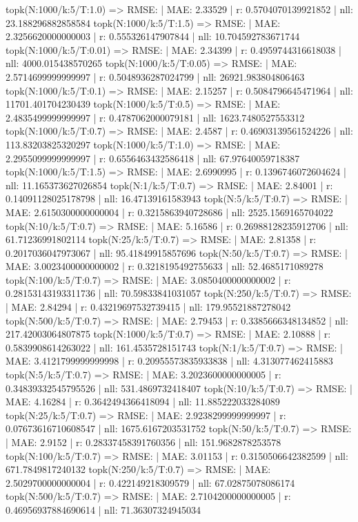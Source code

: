 topk(N:1000/k:5/T:1.0) => RMSE: | MAE: 2.33529 | r: 0.5704070139921852 | nll: 23.188296882858584
topk(N:1000/k:5/T:1.5) => RMSE: | MAE: 2.3256620000000003 | r: 0.555326147907844 | nll: 10.704592783671744
topk(N:1000/k:5/T:0.01) => RMSE: | MAE: 2.34399 | r: 0.4959744316618038 | nll: 4000.015438570265
topk(N:1000/k:5/T:0.05) => RMSE: | MAE: 2.5714699999999997 | r: 0.5048936287024799 | nll: 26921.983804806463
topk(N:1000/k:5/T:0.1) => RMSE: | MAE: 2.15257 | r: 0.5084796645471964 | nll: 11701.401704230439
topk(N:1000/k:5/T:0.5) => RMSE: | MAE: 2.4835499999999997 | r: 0.4787062000079181 | nll: 1623.7480527553312
topk(N:1000/k:5/T:0.7) => RMSE: | MAE: 2.4587 | r: 0.46903139561524226 | nll: 113.83203825320297
topk(N:1000/k:5/T:1.0) => RMSE: | MAE: 2.2955099999999997 | r: 0.6556463432586418 | nll: 67.97640059718387
topk(N:1000/k:5/T:1.5) => RMSE: | MAE: 2.6990995 | r: 0.1396746072604624 | nll: 11.165373627026854
topk(N:1/k:5/T:0.7) => RMSE: | MAE: 2.84001 | r: 0.14091128025178798 | nll: 16.47139161583943
topk(N:5/k:5/T:0.7) => RMSE: | MAE: 2.6150300000000004 | r: 0.3215863940728686 | nll: 2525.1569165704022
topk(N:10/k:5/T:0.7) => RMSE: | MAE: 5.16586 | r: 0.26988128235912706 | nll: 61.71236991802114
topk(N:25/k:5/T:0.7) => RMSE: | MAE: 2.81358 | r: 0.2017036047973067 | nll: 95.41849915857696
topk(N:50/k:5/T:0.7) => RMSE: | MAE: 3.0023400000000002 | r: 0.3218195492755633 | nll: 52.4685171089278
topk(N:100/k:5/T:0.7) => RMSE: | MAE: 3.0850400000000002 | r: 0.28153143193311736 | nll: 70.59833841031057
topk(N:250/k:5/T:0.7) => RMSE: | MAE: 2.84294 | r: 0.43219697532739415 | nll: 179.95521887278042
topk(N:500/k:5/T:0.7) => RMSE: | MAE: 2.79453 | r: 0.3385666348134852 | nll: 217.42003064807875
topk(N:1000/k:5/T:0.7) => RMSE: | MAE: 2.10888 | r: 0.5839908614263022 | nll: 161.4535728151743
topk(N:1/k:5/T:0.7) => RMSE: | MAE: 3.4121799999999998 | r: 0.20955573835933838 | nll: 4.313077462415883
topk(N:5/k:5/T:0.7) => RMSE: | MAE: 3.2023600000000005 | r: 0.34839332545795526 | nll: 531.4869732418407
topk(N:10/k:5/T:0.7) => RMSE: | MAE: 4.16284 | r: 0.3642494366418094 | nll: 11.885222033284089
topk(N:25/k:5/T:0.7) => RMSE: | MAE: 2.9238299999999997 | r: 0.07673616710608547 | nll: 1675.6167203531752
topk(N:50/k:5/T:0.7) => RMSE: | MAE: 2.9152 | r: 0.28337458391760356 | nll: 151.9682878253578
topk(N:100/k:5/T:0.7) => RMSE: | MAE: 3.01153 | r: 0.3150506642382599 | nll: 671.7849817240132
topk(N:250/k:5/T:0.7) => RMSE: | MAE: 2.5029700000000004 | r: 0.422149218309579 | nll: 67.02875078086174
topk(N:500/k:5/T:0.7) => RMSE: | MAE: 2.7104200000000005 | r: 0.46956937884690614 | nll: 71.36307324945034
